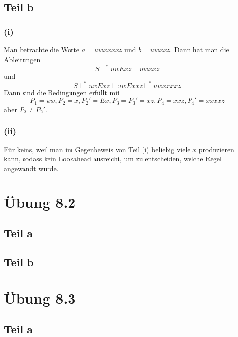 \documentclass[10pt,a4paper]{article}
\begin{document}
\subsection{Teil b}

\subsubsection{(i)}

Man betrachte die Worte $a = uwxxxxz$ und $b = uwxxz$.
Dann hat man die Ableitungen
\begin{equation}
  S \vdash^{*} uwExz \vdash uwxxz
\end{equation}
und
\begin{equation}
  S \vdash^{*} uwExz \vdash uwExxz \vdash^{*} uwxxxxz
\end{equation}
Dann sind die Bedingungen erfüllt mit
\begin{equation}
  P_{1} = uw, P_{2} = x, P_{2}' = Ex, P_{3} = P_{3}' = xz, P_{4} = xxz, P_{4}' = xxxxz
\end{equation}
aber $P_{2} \ne P_{2}'$.

\subsubsection{(ii)}

Für keins, weil man im Gegenbeweis von Teil (i) beliebig viele $x$ produzieren kann, sodass kein Lookahead ausreicht, um zu entscheiden, welche Regel angewandt wurde.

\section{Übung 8.2}

\subsection{Teil a}

\subsection{Teil b}

\section{Übung 8.3}

\subsection{Teil a}
\end{document}
